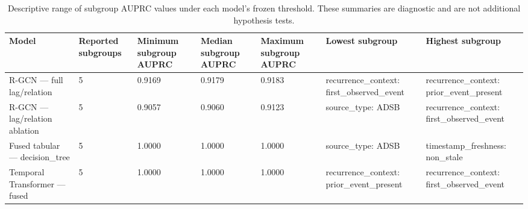\begin{table}
\caption{Descriptive range of subgroup AUPRC values under each model's frozen threshold. These summaries are diagnostic and are not additional hypothesis tests.}
\label{tab:subgroup-robustness}
\begin{tabular}{lllllll}
\toprule
Model & Reported subgroups & Minimum subgroup AUPRC & Median subgroup AUPRC & Maximum subgroup AUPRC & Lowest subgroup & Highest subgroup \\
\midrule
R-GCN — full lag/relation & 5 & 0.9169 & 0.9179 & 0.9183 & recurrence\_context: first\_observed\_event & recurrence\_context: prior\_event\_present \\
R-GCN — lag/relation ablation & 5 & 0.9057 & 0.9060 & 0.9123 & source\_type: ADSB & recurrence\_context: first\_observed\_event \\
Fused tabular — decision\_tree & 5 & 1.0000 & 1.0000 & 1.0000 & source\_type: ADSB & timestamp\_freshness: non\_stale \\
Temporal Transformer — fused & 5 & 1.0000 & 1.0000 & 1.0000 & recurrence\_context: prior\_event\_present & recurrence\_context: first\_observed\_event \\
\bottomrule
\end{tabular}
\end{table}
